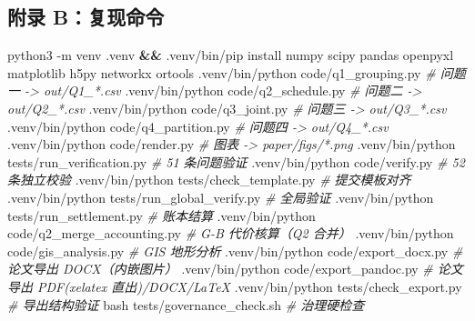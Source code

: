 \documentclass[
  10.5pt,
]{extarticle}
\newenvironment{Shaded}{}{}
\newcommand{\AttributeTok}[1]{\textcolor[rgb]{0.49,0.56,0.16}{#1}}
\newcommand{\CommentTok}[1]{\textcolor[rgb]{0.38,0.63,0.69}{\textit{#1}}}
\newcommand{\ExtensionTok}[1]{#1}
\newcommand{\FunctionTok}[1]{\textcolor[rgb]{0.02,0.16,0.49}{#1}}
\newcommand{\KeywordTok}[1]{\textcolor[rgb]{0.00,0.44,0.13}{\textbf{#1}}}
\newcommand{\NormalTok}[1]{#1}
\begin{document}
\subsection{附录
B：复现命令}\label{ux9644ux5f55-bux590dux73b0ux547dux4ee4}

\begin{Shaded}
\begin{Highlighting}[]
\ExtensionTok{python3} \AttributeTok{{-}m}\NormalTok{ venv .venv }\KeywordTok{\&\&} \ExtensionTok{.venv/bin/pip}\NormalTok{ install numpy scipy pandas openpyxl matplotlib h5py networkx ortools}
\ExtensionTok{.venv/bin/python}\NormalTok{ code/q1\_grouping.py      }\CommentTok{\# 问题一 {-}\textgreater{} out/Q1\_*.csv}
\ExtensionTok{.venv/bin/python}\NormalTok{ code/q2\_schedule.py      }\CommentTok{\# 问题二 {-}\textgreater{} out/Q2\_*.csv}
\ExtensionTok{.venv/bin/python}\NormalTok{ code/q3\_joint.py         }\CommentTok{\# 问题三 {-}\textgreater{} out/Q3\_*.csv}
\ExtensionTok{.venv/bin/python}\NormalTok{ code/q4\_partition.py     }\CommentTok{\# 问题四 {-}\textgreater{} out/Q4\_*.csv}
\ExtensionTok{.venv/bin/python}\NormalTok{ code/render.py           }\CommentTok{\# 图表 {-}\textgreater{} paper/figs/*.png}
\ExtensionTok{.venv/bin/python}\NormalTok{ tests/run\_verification.py    }\CommentTok{\# 51 条问题验证}
\ExtensionTok{.venv/bin/python}\NormalTok{ code/verify.py               }\CommentTok{\# 52 条独立校验}
\ExtensionTok{.venv/bin/python}\NormalTok{ tests/check\_template.py      }\CommentTok{\# 提交模板对齐}
\ExtensionTok{.venv/bin/python}\NormalTok{ tests/run\_global\_verify.py   }\CommentTok{\# 全局验证}
\ExtensionTok{.venv/bin/python}\NormalTok{ tests/run\_settlement.py      }\CommentTok{\# 账本结算}
\ExtensionTok{.venv/bin/python}\NormalTok{ code/q2\_merge\_accounting.py  }\CommentTok{\# G{-}B 代价核算（Q2 合并）}
\ExtensionTok{.venv/bin/python}\NormalTok{ code/gis\_analysis.py         }\CommentTok{\# GIS 地形分析}
\ExtensionTok{.venv/bin/python}\NormalTok{ code/export\_docx.py          }\CommentTok{\# 论文导出 DOCX（内嵌图片）}
\ExtensionTok{.venv/bin/python}\NormalTok{ code/export\_pandoc.py        }\CommentTok{\# 论文导出 PDF(xelatex 直出)/DOCX/LaTeX}
\ExtensionTok{.venv/bin/python}\NormalTok{ tests/check\_export.py        }\CommentTok{\# 导出结构验证}
\FunctionTok{bash}\NormalTok{ tests/governance\_check.sh                }\CommentTok{\# 治理硬检查}
\end{Highlighting}
\end{Shaded}
\end{document}
